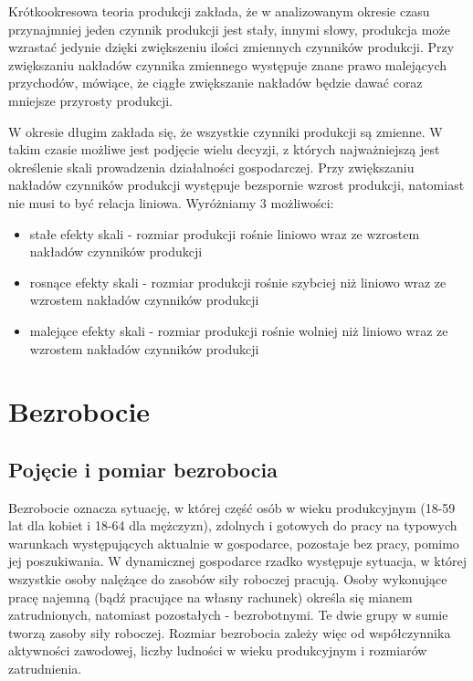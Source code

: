 \documentclass[12pt]{extarticle}
\begin{document}
Krótkookresowa teoria produkcji zakłada, że w analizowanym okresie czasu przynajmniej jeden czynnik produkcji jest stały, innymi słowy, produkcja może wzrastać jedynie dzięki zwiększeniu ilości zmiennych czynników produkcji. Przy zwiększaniu nakładów czynnika zmiennego występuje znane prawo malejących przychodów, mówiące, że ciągłe zwiększanie nakładów będzie dawać coraz mniejsze przyrosty produkcji.

W okresie długim zakłada się, że wszystkie czynniki produkcji są zmienne. W takim czasie możliwe jest podjęcie wielu decyzji, z których najważniejszą jest określenie skali prowadzenia działalności gospodarczej. Przy zwiększaniu nakładów czynników produkcji występuje bezspornie wzrost produkcji, natomiast nie musi to być relacja liniowa. Wyróżniamy 3 możliwości:

\begin{itemize}
	\item stałe efekty skali - rozmiar produkcji rośnie liniowo wraz ze wzrostem nakładów czynników produkcji
	\item rosnące efekty skali - rozmiar produkcji rośnie szybciej niż liniowo wraz ze wzrostem nakładów czynników produkcji
	\item malejące efekty skali - rozmiar produkcji rośnie wolniej niż liniowo wraz ze wzrostem nakładów czynników produkcji
\end{itemize}

\section{Bezrobocie}

\subsection{Pojęcie i pomiar bezrobocia}

Bezrobocie oznacza sytuację, w której część osób w wieku produkcyjnym (18-59 lat dla kobiet i 18-64 dla mężczyzn), zdolnych i gotowych do pracy na typowych warunkach występujących aktualnie w gospodarce, pozostaje bez pracy, pomimo jej poszukiwania. W dynamicznej gospodarce rzadko występuje sytuacja, w której wszystkie osoby nalężące do zasobów siły roboczej pracują. Osoby wykonujące pracę najemną (bądź pracujące na własny rachunek) określa się mianem zatrudnionych, natomiast pozostałych - bezrobotnymi. Te dwie grupy w sumie tworzą zasoby siły roboczej. Rozmiar bezrobocia zależy więc od współczynnika aktywności zawodowej, liczby ludności w wieku produkcyjnym i rozmiarów zatrudnienia.
\end{document}
